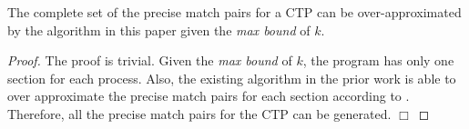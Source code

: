 \begin{theorem}
The complete set of the precise match pairs for a CTP can be over-approximated by the algorithm in this paper given the \textit{max bound} of $k$.
\label{theorem:precise}
\end{theorem}
\begin{proof}
The proof is trivial. Given the \textit{max bound} of $k$, the program has only one section for each process. Also, the existing algorithm in the prior work \cite{DBLP:conf/kbse/HuangMM13} is able to over approximate the precise match pairs for each section according to . Therefore, all the precise match pairs for the CTP can be generated.
$\Box$


\end{proof}

